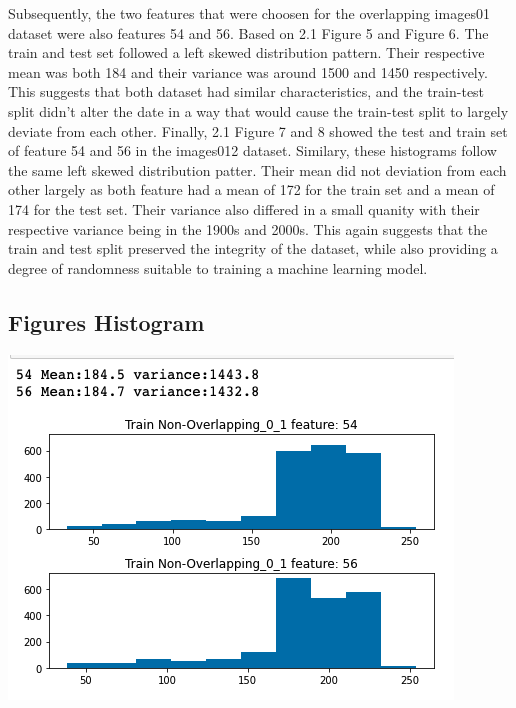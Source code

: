 \documentclass[12pt]{article}
\begin{document}
\begin{multicols*}{2}
  \hspace*{5mm} Subsequently, the two features that were choosen for the overlapping images01 dataset were also features 54 and 56. Based 
  on 2.1 Figure 5 and Figure 6. The train and test set followed a left skewed distribution pattern. Their respective mean was both 184 and their
  variance was around 1500 and 1450 respectively. This suggests that both dataset had similar characteristics, and the train-test split didn't
  alter the date in a way that would cause the train-test split to largely deviate from each other. Finally, 2.1 Figure 7 and 8 showed the test and train set of
  feature 54 and 56 in the images012 dataset. Similary, these histograms follow the same left skewed distribution patter. Their mean did not deviation from 
  each other largely as both feature had a mean of 172 for the train set and a mean of 174 for the test set. Their variance also differed in a small
  quanity with their respective variance being in the 1900s and 2000s. This again suggests that the train and test split preserved the integrity of the dataset,
  while also providing a degree of randomness suitable to training a machine learning model.

  \subsection{Figures Histogram} 
	\begin{center}
		\includegraphics[scale=0.3]{../screenshot/train_non_over_01.png}


\end{center}
\end{multicols*}
\end{document}
